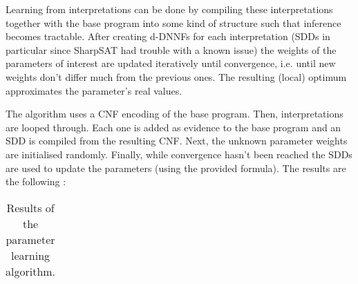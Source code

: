 

Learning from interpretations can be done by compiling these interpretations together with the base program into some kind of structure such that inference becomes tractable. After creating d-DNNFs for each interpretation (SDDs in particular since SharpSAT had trouble with a known issue) the weights of the parameters of interest are updated iteratively until convergence, i.e. until new weights don't differ much from the previous ones. The resulting (local) optimum approximates the parameter's real values.\\

\par\noindent The algorithm uses a CNF encoding of the base program. Then, interpretations are looped through. Each one is added as evidence to the base program and an SDD is compiled from the resulting CNF. Next, the unknown parameter weights are initialised randomly. Finally, while convergence hasn't been reached the SDDs are used to update the parameters (using the provided formula). The results are the following :

\begin{table}[h]
\centering
\begin{tabular}{ccc}
& &\\\hline
\end{tabular}
\caption{Results of the parameter learning algorithm.}
\label{plres}
\end{table}